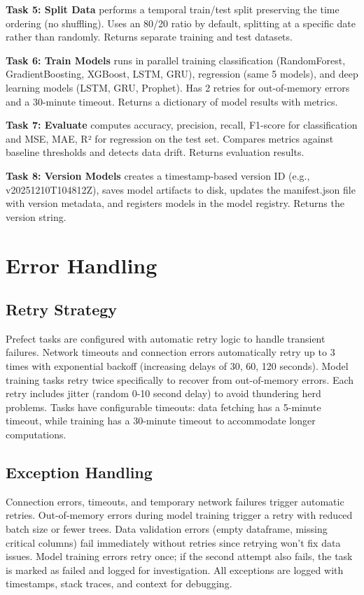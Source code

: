 \textbf{Task 5: Split Data} performs a temporal train/test split preserving the time ordering (no shuffling). Uses an 80/20 ratio by default, splitting at a specific date rather than randomly. Returns separate training and test datasets.

\textbf{Task 6: Train Models} runs in parallel training classification (RandomForest, GradientBoosting, XGBoost, LSTM, GRU), regression (same 5 models), and deep learning models (LSTM, GRU, Prophet). Has 2 retries for out-of-memory errors and a 30-minute timeout. Returns a dictionary of model results with metrics.

\textbf{Task 7: Evaluate} computes accuracy, precision, recall, F1-score for classification and MSE, MAE, R² for regression on the test set. Compares metrics against baseline thresholds and detects data drift. Returns evaluation results.

\textbf{Task 8: Version Models} creates a timestamp-based version ID (e.g., v20251210T104812Z), saves model artifacts to disk, updates the manifest.json file with version metadata, and registers models in the model registry. Returns the version string.

\section{Error Handling}

\subsection{Retry Strategy}

Prefect tasks are configured with automatic retry logic to handle transient failures. Network timeouts and connection errors automatically retry up to 3 times with exponential backoff (increasing delays of 30, 60, 120 seconds). Model training tasks retry twice specifically to recover from out-of-memory errors. Each retry includes jitter (random 0-10 second delay) to avoid thundering herd problems. Tasks have configurable timeouts: data fetching has a 5-minute timeout, while training has a 30-minute timeout to accommodate longer computations.

\subsection{Exception Handling}

Connection errors, timeouts, and temporary network failures trigger automatic retries. Out-of-memory errors during model training trigger a retry with reduced batch size or fewer trees. Data validation errors (empty dataframe, missing critical columns) fail immediately without retries since retrying won't fix data issues. Model training errors retry once; if the second attempt also fails, the task is marked as failed and logged for investigation. All exceptions are logged with timestamps, stack traces, and context for debugging.

